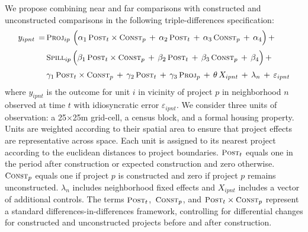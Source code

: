 \documentclass[12pt]{article}
\begin{document}
We propose combining near and far comparisons with constructed and unconstructed comparisons in the following triple-differences specification:
\begin{align}\label{eq:main}
\begin{split}
\quad y_{ipnt} \, =& \,   \textsc{\small Proj}_{ip} \,\, \Big( \alpha_1 \, \textsc{\small Post}_{t}\times\textsc{\small Const}_{p} \, + \, \alpha_2 \, \textsc{\small Post}_{t} \, + \, \alpha_3 \, \textsc{\small Const}_{p}\, +\, \alpha_4 \Big) \, + \\[.2em]
& \, \textsc{\small Spill}_{ip} \, \Big( \beta_1 \, \textsc{\small Post}_{t}\times\textsc{\small Const}_{p} \, + \, \beta_2 \, \textsc{\small Post}_{t} \, + \, \beta_3 \, \textsc{\small Const}_{p} \, +\, \beta_4 \Big) \, + \\[.2em]
& \, \gamma_1 \,  \textsc{\small Post}_{t}\times\textsc{\small Const}_{p} \, + \, \gamma_2 \,\textsc{\small Post}_{t} \, + \, \gamma_3 \,  \textsc{\small Proj}_{p} \, + \, \theta \, X_{ipnt} \, + \, \lambda_n \, + \, \varepsilon_{ipnt} \quad 
\end{split}
\end{align}  %
\noindent where $y_{ipnt}$ is the outcome for unit $i$ in vicinity of project $p$ in neighborhood $n$ observed at time $t$ with idiosyncratic error $\varepsilon_{ipnt}$.  We consider three units of observation: a 25$\times$25m grid-cell, a census block, and a formal housing property.  Units are weighted according to their spatial area to ensure that project effects are representative across space.  Each unit is assigned to its nearest project according to the euclidean distances to project boundaries.  $\textsc{\small Post}_{t}$ equals one in the period after construction or expected construction and zero otherwise.  $\textsc{\small Const}_{p}$ equals one if project $p$ is constructed and zero if project $p$ remains unconstructed.  $\lambda_{n}$ includes neighborhood fixed effects and $X_{ipnt}$ includes a vector of additional controls.  The terms $\textsc{\small Post}_{t}$, $\,\textsc{\small Const}_{p}$, and $\textsc{\small Post}_{t}\times\textsc{\small Const}_{p}$ represent a standard differences-in-differences framework, controlling for differential changes for constructed and unconstructed projects before and after construction.  
\end{document}
